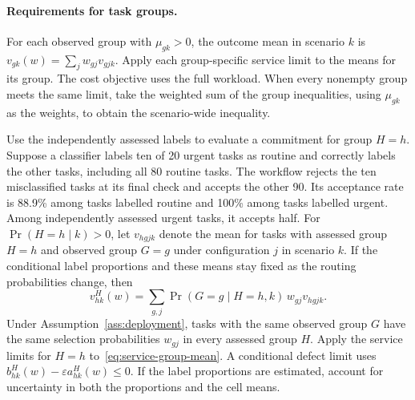 \documentclass[11pt,reqno]{amsart}
\theoremstyle{definition}
\theoremstyle{remark}
\begin{document}
\paragraph{Requirements for task groups.}
For each observed group with \(\mu_{gk}>0\), the outcome mean in scenario \(k\) is \(v_{gk}(w)=\sum_jw_{gj}v_{gjk}\). Apply each group-specific service limit to the means for its group. The cost objective uses the full workload. When every nonempty group meets the same limit, take the weighted sum of the group inequalities, using \(\mu_{gk}\) as the weights, to obtain the scenario-wide inequality.

Use the independently assessed labels to evaluate a commitment for group \(H=h\). Suppose a classifier labels ten of 20 urgent tasks as routine and correctly labels the other tasks, including all 80 routine tasks. The workflow rejects the ten misclassified tasks at its final check and accepts the other 90. Its acceptance rate is 88.9\% among tasks labelled routine and 100\% among tasks labelled urgent. Among independently assessed urgent tasks, it accepts half. For \(\Pr(H=h\mid k)>0\), let \(v_{hgjk}\) denote the mean for tasks with assessed group \(H=h\) and observed group \(G=g\) under configuration \(j\) in scenario \(k\). If the conditional label proportions and these means stay fixed as the routing probabilities change, then
\begin{equation}
 v^H_{hk}(w)=\sum_{g,j}\Pr(G=g\mid H=h,k)\,w_{gj}v_{hgjk}.
 \label{eq:service-group-mean}
\end{equation}
Under Assumption~\ref{ass:deployment}, tasks with the same observed group \(G\) have the same selection probabilities \(w_{gj}\) in every assessed group \(H\). Apply the service limits for \(H=h\) to~\eqref{eq:service-group-mean}. A conditional defect limit uses \(b^H_{hk}(w)-\varepsilon a^H_{hk}(w)\le0\). If the label proportions are estimated, account for uncertainty in both the proportions and the cell means.
\end{document}
